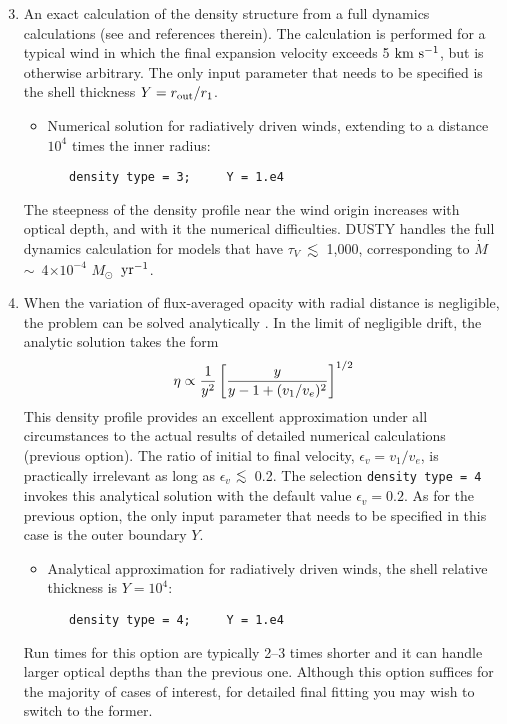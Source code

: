 \documentclass[12pt]{article} \usepackage{epsf}
\def\E#1{\hbox{$10^{#1}$}}
\def\eq#1{\begin{equation} #1 \end{equation}}
\def\about  {\hbox{$\sim$}}
\def\laa    {\mathrel{\hbox{\raise.3ex\hbox{$<$}\llap
                                {\lower.8ex\hbox{$\sim$}}}}}
\def\la     {\hbox{$\laa$}}
\def\x      {\hbox{$\times$}}
\def\tV     {\hbox{$\tau_V$}}
\def\Mo     {\hbox{$M_{\odot}$}}
\def\Mdot   {\hbox{$\dot{M}$}}
\def\kms    {\hbox{$\rm km\ s^{-1}$}}
\def\tthdump#1{#1}      %
\begin{document}
\begin{enumerate}
\setcounter{enumi}{2} \tthdump{\item}
An exact calculation of the density structure from a full dynamics calculations
(see \cite{IE95} and references therein).  The calculation is performed for a
typical wind in which the final expansion velocity exceeds 5 \kms, but is
otherwise arbitrary. The only input parameter that needs to be specified is the
shell thickness $Y = r_{\rm out}/r_1$.

\begin{itemize}
\item
Numerical solution for radiatively driven winds, extending to a distance $10^4$
times the inner radius:

\begin{verbatim}
   density type = 3;     Y = 1.e4
\end{verbatim}
\end{itemize}
The steepness of the density profile near the wind origin increases with
optical depth, and with it the numerical difficulties.  DUSTY handles the full
dynamics calculation for models that have \tV\ \la\ 1,000, corresponding to
\Mdot\ \about\ 4\x\E{-4} \Mo\ $\rm yr^{-1}$.

\item
When the variation of flux-averaged opacity with radial distance is negligible,
the problem can be solved analytically \cite{IEprep}.  In the limit of
negligible drift, the analytic solution takes the form
\eq{
    \eta \propto {1\over y^2}\left[{y \over y - 1 + (v_1/v_e)^2}\right]^{1/2}
}
This density profile provides an excellent approximation under all
circumstances to the actual results of detailed numerical calculations
(previous option). The ratio of initial to final velocity, $\epsilon_v =
v_1/v_e$, is practically irrelevant as long as $\epsilon_v$ \la\ 0.2. The
selection {\tt density type = 4} invokes this analytical solution with the
default value $\epsilon_v = 0.2$. As for the previous option, the only input
parameter that needs to be specified in this case is the outer boundary $Y$.

\begin{itemize}
\item
Analytical approximation for radiatively driven winds, the shell relative
thickness is $Y = 10^4$:

\begin{verbatim}
   density type = 4;     Y = 1.e4
\end{verbatim}
\end{itemize}
Run times for this option are typically 2--3 times shorter and it can handle
larger optical depths than the previous one. Although this option suffices for
the majority of cases of interest, for detailed final fitting you may wish to
switch to the former.

\end{enumerate}
\end{document}
